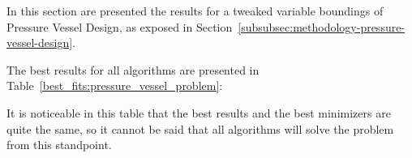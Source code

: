 In this section are presented the results for a tweaked variable boundings of Pressure Vessel Design,
as exposed in Section~\ref{subsubsec:methodology-pressure-vessel-design}.

The best results for all algorithms are presented in Table~\ref{best_fits:pressure_vessel_problem}:

\begin{table}[H]
\centering
\caption{Best Fits for Pressure Vessel Design}
\label{best_fits:pressure_vessel_problem}
\end{table}

It is noticeable in this table that the best results and the best minimizers are quite the same,
so it cannot be said that all algorithms will solve the problem from this standpoint.

